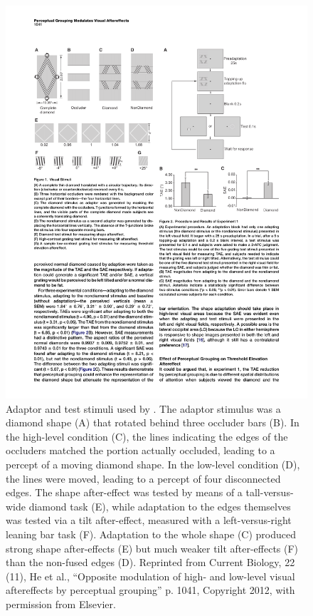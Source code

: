 \begin{figure}[!ht]
  \centering
  \includegraphics[]{he-et-al-2012-fig1.pdf}  
  \caption{Adaptor and test stimuli used by \protect\textcite{He2012}.  The adaptor stimulus was a diamond shape (A) that rotated behind three occluder bars (B).  In the high-level condition (C), the lines indicating the edges of the occluders matched the portion actually occluded, leading to a percept of a moving diamond shape.  In the low-level condition (D), the lines were moved, leading to a percept of four disconnected edges.  The shape after-effect was tested by means of a tall-versus-wide diamond task (E), while adaptation to the edges themselves was tested via a tilt after-effect, measured with a left-versus-right leaning bar task (F).  Adaptation to the whole shape (C) produced strong shape after-effects (E) but much weaker tilt after-effects (F) than the non-fused edges (D).  Reprinted from Current Biology, 22 (11), He et al., ``Opposite modulation of high- and low-level visual aftereffects by perceptual grouping'' p. 1041, Copyright 2012, with permission from Elsevier.}
  \label{fig:he-et-al-2012-stims}
\end{figure}


